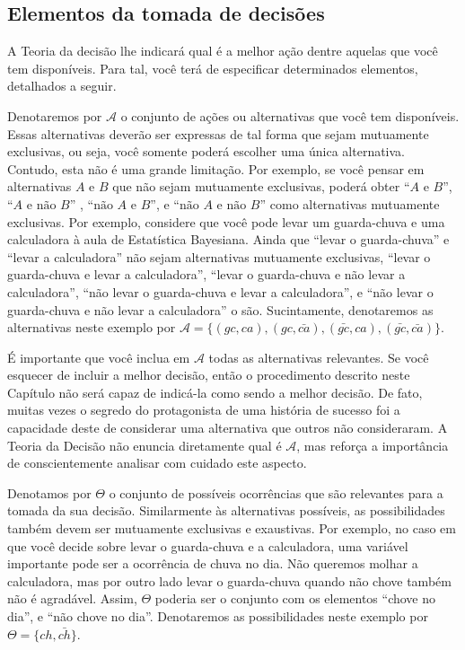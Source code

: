 \subsection{Elementos da tomada de decisões}
\label{section:decisions_elements}

A Teoria da decisão lhe indicará qual é a melhor ação
dentre aquelas que você tem disponíveis.
Para tal, você terá de especificar determinados elementos,
detalhados a seguir.

Denotaremos por $\mathcal{A}$ o conjunto de ações ou alternativas
que você tem disponíveis.
Essas alternativas deverão ser expressas de tal forma que sejam mutuamente exclusivas,
ou seja, você somente poderá escolher uma única alternativa.
Contudo, esta não é uma grande limitação.
Por exemplo, se você pensar em alternativas $A$ e $B$ que não sejam mutuamente exclusivas,
poderá obter ``$A \text{ e } B$'',
``$A \text{ e não } B$'' ,
``$\text{não } A \text{ e } B$'', e
``$\text{não } A \text{ e não } B$''
como alternativas mutuamente exclusivas. Por exemplo, 
considere que você pode levar um guarda-chuva e 
uma calculadora à aula de Estatística Bayesiana.
Ainda que ``levar o guarda-chuva'' e ``levar a calculadora''
não sejam alternativas mutuamente exclusivas,
``levar o guarda-chuva e levar a calculadora'',
``levar o guarda-chuva e não levar a calculadora'',
``não levar o guarda-chuva e levar a calculadora'', e
``não levar o guarda-chuva e não levar a calculadora'' o são.
Sucintamente, denotaremos as alternativas neste exemplo por
$\mathcal{A} = \{(gc,ca), (gc,\bar{ca}), (\bar{gc},ca), (\bar{gc},\bar{ca})\}$.

É importante que você inclua em $\mathcal{A}$
todas as alternativas relevantes.
Se você esquecer de incluir a melhor decisão,
então o procedimento descrito neste Capítulo
não será capaz de indicá-la como sendo a melhor decisão.
De fato, muitas vezes o segredo do protagonista de uma história de sucesso
foi a capacidade deste de considerar uma alternativa que outros não consideraram.
A Teoria da Decisão não
enuncia diretamente qual é $\mathcal{A}$,
mas reforça a importância de conscientemente analisar com cuidado este aspecto.

Denotamos por $\Theta$ o conjunto de possíveis ocorrências
que são relevantes para a tomada da sua decisão.
Similarmente às alternativas possíveis,
as possibilidades também devem ser
mutuamente exclusivas e exaustivas. 
Por exemplo, no caso em que você decide sobre levar o
guarda-chuva e a calculadora,
uma variável importante pode ser a
ocorrência de chuva no dia.
Não queremos molhar a calculadora, mas por outro lado levar o guarda-chuva quando não chove também não é agradável.
Assim,  $\Theta$ poderia ser
o conjunto com os elementos ``chove no dia'', e 
``não chove no dia''. Denotaremos as
possibilidades neste exemplo por
$\Theta = \{ch, \bar{ch}\}$.

